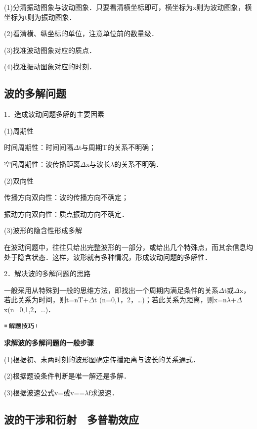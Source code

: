 (1)分清振动图象与波动图象．只要看清横坐标即可，横坐标为x则为波动图象，横坐标为t则为振动图象．

(2)看清横、纵坐标的单位，注意单位前的数量级．

(3)找准波动图象对应的质点．

(4)找准振动图象对应的时刻．


\newpage  
\subsection{波的多解问题}

1．造成波动问题多解的主要因素

(1)周期性

时间周期性：时间间隔$\Delta$t与周期T的关系不明确；

空间周期性：波传播距离$\Delta$x与波长$\lambda$的关系不明确．

(2)双向性

传播方向双向性：波的传播方向不确定；

振动方向双向性：质点振动方向不确定．

(3)波形的隐含性形成多解

在波动问题中，往往只给出完整波形的一部分，或给出几个特殊点，而其余信息均处于隐含状态．这样，波形就有多种情况，形成波动问题的多解性．

2．解决波的多解问题的思路

一般采用从特殊到一般的思维方法，即找出一个周期内满足条件的关系$\Delta$t或$\Delta$x，若此关系为时间，则t=nT+$\Delta$t
(n=0,1，2，\ldots)；若此关系为距离，则x=n$\lambda$+$\Delta$x(n=0,1,2，\ldots)．

\begin{center}\includegraphics[width=0.70764in,height=0.12292in]{media/image37.png}\end{center}
\begin{center}
  \textbf{求解波的多解问题的一般步骤}
\end{center}

(1)根据初、末两时刻的波形图确定传播距离与波长的关系通式．

(2)根据题设条件判断是唯一解还是多解．

(3)根据波速公式v=或v==$\lambda$f求波速．


\subsection{波的干涉和衍射　多普勒效应}

